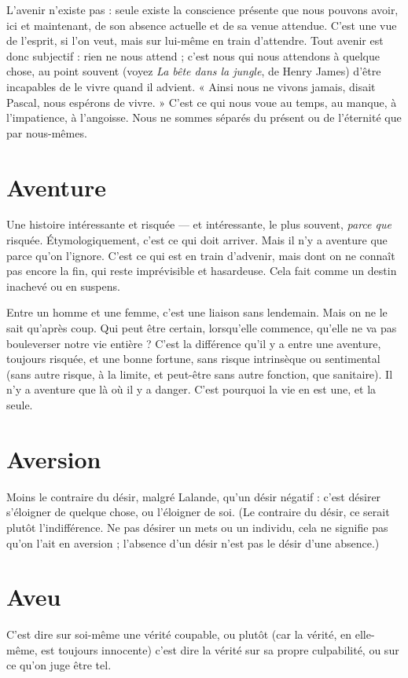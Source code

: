 L'avenir n'existe pas : seule existe la conscience présente que nous pouvons
avoir, ici et maintenant, de son absence actuelle et de sa venue attendue. C’est
une vue de l’esprit, si l’on veut, mais sur lui-même en train d’attendre. Tout
avenir est donc subjectif : rien ne nous attend ; c’est nous qui nous attendons à
quelque chose, au point souvent (voyez {\it La bête dans la jungle}, de Henry James)
d’être incapables de le vivre quand il advient. « Ainsi nous ne vivons jamais,
disait Pascal, nous espérons de vivre. » C’est ce qui nous voue au temps, au
manque, à l’impatience, à l’angoisse. Nous ne sommes séparés du présent ou de
l'éternité que par nous-mêmes.

\section{Aventure}
Une histoire intéressante et risquée — et intéressante, le plus
souvent, {\it parce que} risquée. Étymologiquement, c’est ce qui doit
arriver. Mais il n’y a aventure que parce qu’on l’ignore. C’est ce qui est en train
d’advenir, mais dont on ne connaît pas encore la fin, qui reste imprévisible et
hasardeuse. Cela fait comme un destin inachevé ou en suspens.

Entre un homme et une femme, c’est une liaison sans lendemain. Mais on
ne le sait qu'après coup. Qui peut être certain, lorsqu’elle commence, qu’elle ne
va pas bouleverser notre vie entière ? C’est la différence qu’il y a entre une aventure,
toujours risquée, et une bonne fortune, sans risque intrinsèque ou sentimental
(sans autre risque, à la limite, et peut-être sans autre fonction, que sanitaire).
Il n’y a aventure que là où il y a danger. C’est pourquoi la vie en est une,
et la seule.

\section{Aversion}
Moins le contraire du désir, malgré Lalande, qu’un désir négatif :
c’est désirer s'éloigner de quelque chose, ou l’éloigner de
soi. (Le contraire du désir, ce serait plutôt l'indifférence. Ne pas désirer un mets
ou un individu, cela ne signifie pas qu’on l’ait en aversion ; l'absence d’un désir
n’est pas le désir d’une absence.)

\section{Aveu}
C'est dire sur soi-même une vérité coupable, ou plutôt (car la vérité,
en elle-même, est toujours innocente) c’est dire la vérité sur sa propre
culpabilité, ou sur ce qu’on juge être tel.

